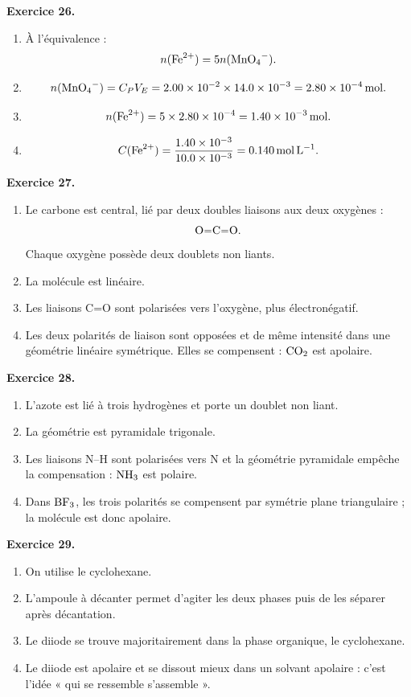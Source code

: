 \documentclass[11pt,a4paper]{article}
\newcommand{\corr}[2]{
  \begin{correctionbox}
  \textbf{Exercice #1.} #2
  \end{correctionbox}
}
\begin{document}
\corr{26}{
\begin{enumerate}
  \item À l'équivalence :
  \[
  n(\ce{Fe^{2+}})=5n(\ce{MnO4-}).
  \]
  \item
  \[
  n(\ce{MnO4-})=C_PV_E
  =2.00\times 10^{-2}\times 14.0\times 10^{-3}
  =\SI{2.80e-4}{mol}.
  \]
  \item
  \[
  n(\ce{Fe^{2+}})=5\times 2.80\times 10^{-4}=\SI{1.40e-3}{mol}.
  \]
  \item
  \[
  C(\ce{Fe^{2+}})=\frac{1.40\times 10^{-3}}{10.0\times 10^{-3}}
  =\SI{0.140}{mol.L^{-1}}.
  \]
\end{enumerate}
}

\corr{27}{
\begin{enumerate}
  \item Le carbone est central, lié par deux doubles liaisons aux deux oxygènes :
  \[
  \ce{O=C=O}.
  \]
  Chaque oxygène possède deux doublets non liants.
  \item La molécule est linéaire.
  \item Les liaisons C=O sont polarisées vers l'oxygène, plus électronégatif.
  \item Les deux polarités de liaison sont opposées et de même intensité dans une géométrie linéaire symétrique. Elles se compensent : $\ce{CO2}$ est apolaire.
\end{enumerate}
}

\corr{28}{
\begin{enumerate}
  \item L'azote est lié à trois hydrogènes et porte un doublet non liant.
  \item La géométrie est pyramidale trigonale.
  \item Les liaisons N--H sont polarisées vers N et la géométrie pyramidale empêche la compensation : $\ce{NH3}$ est polaire.
  \item Dans $\ce{BF3}$, les trois polarités se compensent par symétrie plane triangulaire ; la molécule est donc apolaire.
\end{enumerate}
}

\corr{29}{
\begin{enumerate}
  \item On utilise le cyclohexane.
  \item L'ampoule à décanter permet d'agiter les deux phases puis de les séparer après décantation.
  \item Le diiode se trouve majoritairement dans la phase organique, le cyclohexane.
  \item Le diiode est apolaire et se dissout mieux dans un solvant apolaire : c'est l'idée « qui se ressemble s'assemble ».
\end{enumerate}
}
\end{document}
